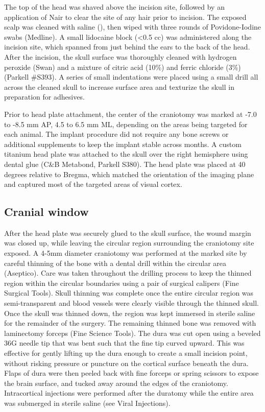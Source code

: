 The top of the head was shaved above the incision site, followed by an application of Nair to clear the site of any hair prior to incision. The exposed scalp was cleaned with saline (), then wiped with three rounds of Povidone-Iodine swabs (Medline). A small lidocaine block (<0.5 cc) was administered along the incision site, which spanned from just behind the ears to the back of the head. After the incision, the skull surface was thoroughly cleaned with hydrogen peroxide (Swan) and a mixture of citric acid (10\%) and ferric chloride (3\%) (Parkell #S393). A series of small indentations were placed using a small drill all across the cleaned skull to increase surface area and texturize the skull in preparation for adhesives. 

Prior to head plate attachment, the center of the craniotomy was marked at -7.0 to -8.5 mm AP, 4.5 to 6.5 mm ML, depending on the areas being targeted for each animal. The implant procedure did not require any bone screws or additional supplements to keep the implant stable across months. A custom titanium head plate was attached to the skull over the right hemisphere using dental glue (C&B Metabond, Parkell S380). The head plate was placed at 40 degrees relative to Bregma, which matched the orientation of the imaging plane and captured most of the targeted areas of visual cortex. 

\subsection{Cranial window}
After the head plate was securely glued to the skull surface, the wound margin was closed up, while leaving the circular region surrounding the craniotomy site exposed. A 4-5mm diameter craniotomy was performed at the marked site by careful thinning of the bone with a dental drill within the circular area (Aseptico). Care was taken throughout the drilling process to keep the thinned region within the circular boundaries using a pair of surgical calipers (Fine Surgical Tools). Skull thinning was complete once the entire circular region was semi-transparent and blood vessels were clearly visible through the thinned skull. Once the skull was thinned down, the region was kept immersed in sterile saline for the remainder of the surgery. The remaining thinned bone was removed with laminectomy forceps (Fine Science Tools). The dura was cut open using a beveled 36G needle tip that was bent such that the fine tip curved upward. This was effective for gently lifting up the dura enough to create a small incision point, without risking pressure or puncture on the cortical surface beneath the dura. Flaps of dura were then peeled back with fine forceps or spring scissors to expose the brain surface, and tucked away around the edges of the craniotomy. Intracortical injections were performed after the duratomy while the entire area was submerged in sterile saline (see Viral Injections).

